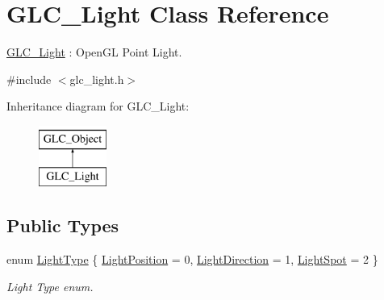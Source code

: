 \hypertarget{class_g_l_c___light}{\section{G\-L\-C\-\_\-\-Light Class Reference}
\label{class_g_l_c___light}
}


\hyperlink{class_g_l_c___light}{G\-L\-C\-\_\-\-Light} \-: Open\-G\-L Point Light.  




{\ttfamily \#include $<$glc\-\_\-light.\-h$>$}

Inheritance diagram for G\-L\-C\-\_\-\-Light\-:\begin{figure}[H]
\begin{center}
\leavevmode
\includegraphics[height=2.000000cm]{class_g_l_c___light}
\end{center}
\end{figure}
\subsection*{Public Types}
\begin{DoxyCompactItemize}
\item 
enum \hyperlink{class_g_l_c___light_a3b07c40e07008c58c5da29ccabfef6a6}{Light\-Type} \{ \hyperlink{class_g_l_c___light_a3b07c40e07008c58c5da29ccabfef6a6abd1dfe7544fffa9827c53dcf65b2df58}{Light\-Position} = 0, 
\hyperlink{class_g_l_c___light_a3b07c40e07008c58c5da29ccabfef6a6a732582299b67022fad31e9aa4ffa0d21}{Light\-Direction} = 1, 
\hyperlink{class_g_l_c___light_a3b07c40e07008c58c5da29ccabfef6a6a7692603efc5b77b548fa032b329b61a0}{Light\-Spot} = 2
 \}
\begin{DoxyCompactList}\small\item\em Light Type enum. \end{DoxyCompactList}\end{DoxyCompactItemize}
